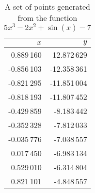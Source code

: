 \begin{table}[ht!]
  \centering
  \begin{tabular}{|r|r|}
    \hline
    $x$ & $y$	\\
    \hline
    \hline
    -0.889\,160 & -12.872\,629	\\
    \hline
    -0.856\,103 & -12.358\,361	\\
    \hline
    -0.821\,295 & -11.851\,004	\\
    \hline
    -0.818\,193 & -11.807\,452	\\
    \hline
    -0.429\,859 & -8.183\,442	\\
    \hline
    -0.352\,328 & -7.812\,033	\\
    \hline
    -0.035\,776 & -7.038\,557	\\
    \hline
    0.017\,450 & -6.983\,134	\\
    \hline
    0.529\,010 & -6.314\,804	\\
    \hline
    0.821\,101 & -4.848\,557	\\
    \hline
  \end{tabular}
  \caption{A set of points generated from the function $5x^3 - 2x^2 + \sin(x) - 7$}
  \label{tab:bg:gp:repr_ev:points}
\end{table}